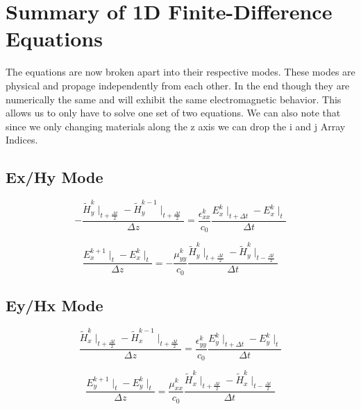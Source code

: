 \documentclass[a4paper,10pt]{article}
\begin{document}
\section{Summary of 1D Finite-Difference Equations}

The equations are now broken apart into their respective modes.  These modes are physical and propage independently from each other.  In the end though they are numerically the same and will exhibit the same electromagnetic behavior.   This allows us to only have to solve one set of two equations.  We can also note that since we only changing materials along the z axis we can drop the i and j Array Indices.



\subsection{Ex/Hy Mode}
\begin{equation}
  - \frac{\tilde{H}_{y}^{k}\mid_{t+\frac  {\Delta t}{2}} - \tilde{H}_{y}^{k-1}\mid_{t+\frac  {\Delta t}{2}}}{\Delta z} = \frac{\epsilon_{xx}^{k}}{c_0} \frac{E_{x}^{k}\mid_{t+\Delta t} - E_{x}^{k}\mid_{t}}{\Delta t}
\end{equation}

\begin{equation}
  \frac{E_{x}^{k+1}\mid_{t} - E_{x}^{k}\mid_{t}}{\Delta z} = -\frac{\mu_{yy}^{k}}{c_0} \frac{\tilde{H}_{y}^{k}\mid_{t+\frac  {\Delta t}{2}} - \tilde{H}_{y}^{k}\mid_{t-\frac{\Delta t}{2}}}{\Delta t}
\end{equation}



\subsection{Ey/Hx Mode}
\begin{equation}
  \label{eq:EinEyHXMode}
  \frac{\tilde{H}_{x}^{k}\mid_{t+\frac{\Delta t}{2}} - \tilde{H}_{x}^{k-1}\mid_{t+\frac  {\Delta t}{2}}}{\Delta z} = \frac{\epsilon_{yy}^{k}}{c_0} \frac{E_{y}^{k}\mid_{t+\Delta t} - E_{y}^{k}\mid_{t}}{\Delta t}
\end{equation}

\begin{equation}
  \label{eq:HinEyHxMode}
  \frac{E_{y}^{k+1}\mid_{t} - E_{y}^{k}\mid_{t}}{\Delta z} = \frac{\mu_{xx}^{k}}{c_0} \frac{\tilde{H}_{x}^{k}\mid_{t+\frac  {\Delta t}{2}} - \tilde{H}_{x}^{k}\mid_{t-\frac{\Delta t}{2}}}{\Delta t}
\end{equation}
\end{document}
